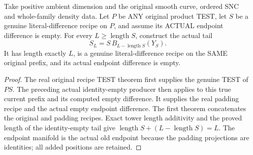 \begin{theorem}
\label{hir:sharp-original-curve-terminal-recipe-actual-padding}
\leanok
Take positive ambient dimension and the original smooth curve, ordered
SNC and whole-family density data. Let $P$ be ANY original product TEST,
let $S$ be a genuine literal-difference recipe on $P$, and assume its
ACTUAL endpoint difference is empty. For every $L\ge\operatorname{length}S$,
construct the actual tail
\[
 S_L=S\,B_{L-\operatorname{length}S}(Y_S).
\]
It has length exactly $L$, is a genuine literal-difference recipe on
the SAME original prefix, and its actual endpoint difference is empty.
\end{theorem}
\begin{proof}
The real original recipe TEST theorem first supplies the genuine TEST
of $PS$. The preceding actual identity-empty producer then applies to
this true current prefix and its computed empty difference. It supplies
the real padding recipe and the actual empty endpoint difference. The
first theorem concatenates the original and padding recipes. Exact
tower length additivity and the proved length of the identity-empty
tail give $\operatorname{length}S+(L-\operatorname{length}S)=L$.
The endpoint manifold is the actual old endpoint because the padding
projections are identities; all added positions are retained.
\end{proof}

